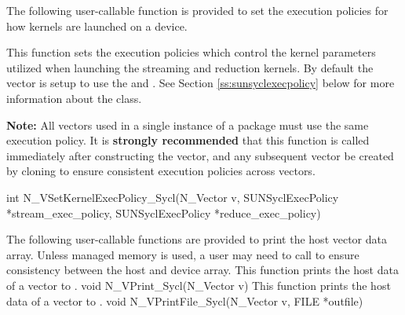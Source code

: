 The following user-callable function is provided to set the execution policies
for how {\sycl} kernels are launched on a device.

{
  This function sets the execution policies which control the kernel parameters
  utilized when launching the streaming and reduction kernels. By default the
  vector is setup to use the  and
  . See Section \ref{ss:sunsyclexecpolicy}
  below for more information about the  class.

  \textbf{Note:} All vectors used in a single instance of a {\sundials} package
  must use the same execution policy. It is \textbf{strongly recommended} that
  this function is called immediately after constructing the vector, and any
  subsequent vector be created by cloning to ensure consistent execution
  policies across vectors.
}
{
  int N\_VSetKernelExecPolicy\_Sycl(N\_Vector v,
   SUNSyclExecPolicy *stream\_exec\_policy,
   SUNSyclExecPolicy *reduce\_exec\_policy)
}


The following user-callable functions are provided to print the host vector data
array. Unless managed memory is used, a user may need to call
 to ensure consistency between the host and
device array.
{
  This function prints the host data of a {\sycl} vector to .
}
{
  void N\_VPrint\_Sycl(N\_Vector v)
}
{
  This function prints the host data of a {\sycl} vector to .
}
{
  void N\_VPrintFile\_Sycl(N\_Vector v, FILE *outfile)
}

